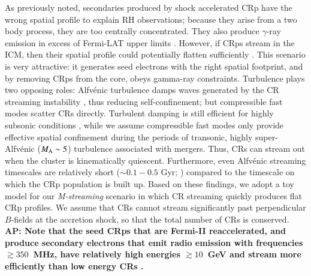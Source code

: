\documentclass[useAMS,usenatbib]{mn2e}
\newcommand{\Mstream}{{\it M-streaming}\xspace}
\def\AP#1{{\bf  AP: #1}}
\begin{document}
As previously noted, secondaries produced by shock accelerated CRp
have the wrong spatial profile to explain RH observations; because
they arise from a two body process, they are too centrally
concentrated. They also produce $\gamma$-ray emission in excess of
Fermi-LAT upper limits
\citep{2012ApJ...757..123A,brunetti12,2014ApJ...787...18A}. However,
if CRps stream in the ICM, then their spatial profile could
potentially flatten sufficiently \citep{ensslin11,wiener13}. This
scenario is very attractive: it generates seed electrons with the
right spatial footprint, and by removing CRps from the core, obeys
gamma-ray constraints. Turbulence plays two opposing roles:
Alfv{\'e}nic turbulence damps waves generated by the CR streaming
instability \citep{yan02,farmer04}, thus reducing self-confinement;
but compressible fast modes scatter CRs directly. Turbulent damping is
still efficient for highly subsonic conditions \citep{wiener13}, while
we assume compressible fast modes only provide effective spatial
confinement during the periods of transonic, highly super-Alfv{\'e}nic
($M_{\rm A} \sim 5$) turbulence associated with mergers. Thus, CRs can
stream out when the cluster is kinematically quiescent. Furthermore,
even Alfv{\'e}nic streaming timescales are relatively short ($\sim
0.1-0.5$ Gyr; \cite{wiener13}) compared to the timescale on which the
CRp population is built up. Based on these findings, we adopt a toy
model for our \Mstream scenario in which CR streaming quickly produces
flat CRp profiles. We assume that CRs cannot
stream significantly past perpendicular $B$-fields at the accretion
shock, so that the total number of CRs is conserved. \AP{Note that the seed CRps that are
  Fermi-II reaccelerated, and produce secondary electrons that emit
  radio emission with frequencies $\gtrsim 350$~MHz, have relatively
  high energies $\gtrsim 10$~GeV and stream more efficiently than low
  energy CRs \citep{wiener13}.}
\end{document}
